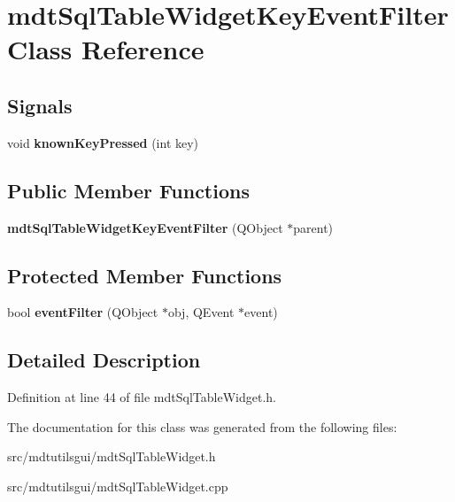 \hypertarget{classmdt_sql_table_widget_key_event_filter}{
\section{mdtSqlTableWidgetKeyEventFilter Class Reference}
\label{classmdt_sql_table_widget_key_event_filter}
}
\subsection*{Signals}
\begin{DoxyCompactItemize}
\item 
\hypertarget{classmdt_sql_table_widget_key_event_filter_a9e91b7d427a1b6444da85a75b14e650d}{
void {\bfseries knownKeyPressed} (int key)}
\label{classmdt_sql_table_widget_key_event_filter_a9e91b7d427a1b6444da85a75b14e650d}

\end{DoxyCompactItemize}
\subsection*{Public Member Functions}
\begin{DoxyCompactItemize}
\item 
\hypertarget{classmdt_sql_table_widget_key_event_filter_ad44cd5588a14efcb3954f3b4950fc688}{
{\bfseries mdtSqlTableWidgetKeyEventFilter} (QObject $\ast$parent)}
\label{classmdt_sql_table_widget_key_event_filter_ad44cd5588a14efcb3954f3b4950fc688}

\end{DoxyCompactItemize}
\subsection*{Protected Member Functions}
\begin{DoxyCompactItemize}
\item 
\hypertarget{classmdt_sql_table_widget_key_event_filter_aad9dc6b018f347cb2b5eca672fdbbf27}{
bool {\bfseries eventFilter} (QObject $\ast$obj, QEvent $\ast$event)}
\label{classmdt_sql_table_widget_key_event_filter_aad9dc6b018f347cb2b5eca672fdbbf27}

\end{DoxyCompactItemize}


\subsection{Detailed Description}


Definition at line 44 of file mdtSqlTableWidget.h.



The documentation for this class was generated from the following files:\begin{DoxyCompactItemize}
\item 
src/mdtutilsgui/mdtSqlTableWidget.h\item 
src/mdtutilsgui/mdtSqlTableWidget.cpp\end{DoxyCompactItemize}

